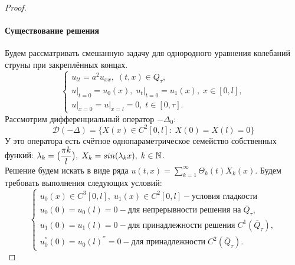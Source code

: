 \begin{proof}
\paragraph{Существование решения} Будем рассматривать смешанную задачу для однородного уравнения колебаний струны при закреплённых концах.
\begin{equation*}
\label{eq:13_2}
\begin{cases}
	u_{tt} = a^2u_{xx},\; (t, x) \in Q_{\tau}, \\
	u\bigr|_{t = 0} = u_0(x),\; u_t\bigr|_{t = 0} = u_1(x),\; x \in [0, l], \\
	u\bigr|_{x = 0} = u\bigr|_{x = l} = 0,\; t \in [0, \tau].
\end{cases}
\end{equation*}
Рассмотрим дифференциальный оператор $-\Delta_{0}$:
$$\mathcal{D}(-\Delta) =\{X(x) \in C^2[0, l]\colon\; X(0) = X(l) = 0\}$$
У это оператора есть счётное однопараметрическое семейство собственных функий: $\lambda_k = \bigl(\dfrac{\pi k}{l}\bigr),\; X_k = sin(\lambda_k x),\; k \in \mathbb{N}$. \\
Решение будем искать в виде ряда $u(t, x) = \sum\limits_{k = 1}^{\infty} \Theta_k(t)X_k(x)$. Будем требовать выполнения следующих условий:
\begin{equation}
\begin{cases}
	u_0(x) \in C^3[0, l],\; u_1(x) \in C^2[0, l] - \textbf{условия гладкости}\\
	u_0(0) = u_0(l) = 0 - \text{для непрерывности решения на}\; \overline{Q}_{\tau}, \\
	u_1(0) = u_1(l) = 0 - \text{для принадлежности решения}\; C^1(\overline{Q}_{\tau}), \\
	u^{''}_0(0) = u_0(l)^{''} = 0 - \text{для принадлежности}\; C^2(\overline{Q}_{\tau}).
\end{cases}
\end{equation}


\end{proof}
